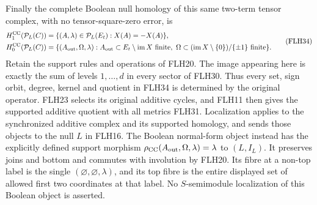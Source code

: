 Finally the complete Boolean null homology of this same
two-term tensor complex, with no tensor-square-zero error, is
\[
\begin{aligned}
H_1^{\rm CC}(\mathcal P_L(C))
 &=\{(A,\lambda)\in\mathcal P_L(E_t):X(A)=-X(A)\},\\
H_0^{\rm CC}(\mathcal P_L(C))
 &=\{(A_{\rm out},\Omega,\lambda):
 A_{\rm out}\subset E_t\setminus\operatorname{im}X\text{ finite},\
 \Omega\subset(\operatorname{im}X\setminus\{0\})/\{\pm1\}
                          \text{ finite}\}.
\end{aligned}\tag{FLH34}
\]
Retain the support rules and operations of FLH20.
The image appearing here is exactly the sum of levels
\(1,\ldots,d\) in every sector of FLH30. Thus every set,
sign orbit, degree, kernel and quotient in FLH34 is determined
by the original operator. FLH23 selects its original additive
cycles, and FLH11 then gives the supported additive quotient
with all metrics FLH31. Localization applies to the
synchronized additive complex and its supported homology,
and sends those objects to the null \(L\) in FLH16.
The Boolean normal-form object instead has the explicitly
defined support morphism
\(\rho_{\rm CC}(A_{\rm out},\Omega,\lambda)=\lambda\)
to \((L,I_L)\). It preserves joins and bottom and commutes
with involution by FLH20. Its fibre at a non-top label is
the single \((\varnothing,\varnothing,\lambda)\), and its
top fibre is the entire displayed set of allowed first two
coordinates at that label. No \(S\)-semimodule localization
of this Boolean object is asserted.

